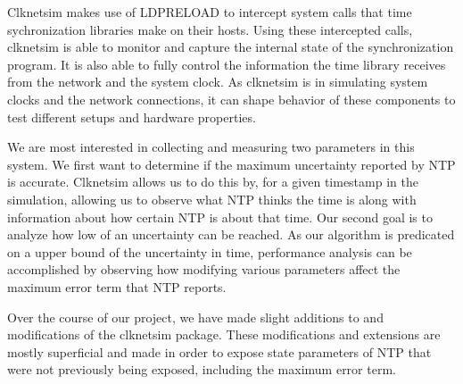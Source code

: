 Clknetsim makes use of LDPRELOAD to intercept system calls that time
sychronization libraries make on their hosts. Using these intercepted
calls, clknetsim is able to monitor and capture the internal state of
the synchronization program. It is also able to fully control the
information the time library receives from the network and the system
clock. As clknetsim is in simulating system clocks and the network
connections, it can shape behavior of these components to test
different setups and hardware properties.
        
We are most interested in collecting and measuring two parameters in
this system. We first want to determine if the maximum uncertainty
reported by NTP is accurate. Clknetsim allows us to do this by, for a
given timestamp in the simulation, allowing us to observe what NTP
thinks the time is along with information about how certain NTP is
about that time. Our second goal is to analyze how low of an
uncertainty can be reached. As our algorithm is predicated on a upper
bound of the uncertainty in time, performance analysis can be
accomplished by observing how modifying various parameters affect the
maximum error term that NTP reports.

Over the course of our project, we have made slight additions to and
modifications of the clknetsim package. These modifications and
extensions are mostly superficial and made in order to expose state
parameters of NTP that were not previously being exposed, including
the maximum error term.
